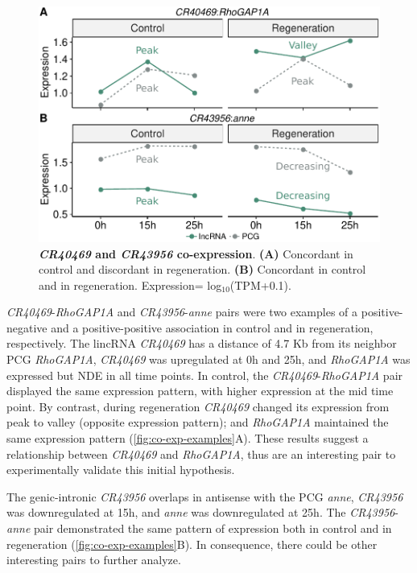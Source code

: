 \begin{figure}[ht!]
  \centering
  \includegraphics[scale=0.6]{plots/results/dme/co.expression.examples.pdf}
  \caption[\textit{CR40469} and \textit{CR43956} co-expression]{\textbf{\textit{CR40469} and \textit{CR43956} co-expression}. \textbf{(A)} Concordant in control and discordant in regeneration. \textbf{(B)} Concordant in control and in regeneration. Expression= log$_{10}$(TPM+0.1).}
  \label{fig:co-exp-examples}
\end{figure}

\textit{CR40469}-\textit{RhoGAP1A} and \textit{CR43956}-\textit{anne} pairs were two examples of a positive-negative and a positive-positive association in control and in regeneration, respectively. The lincRNA \textit{CR40469} has a distance of 4.7 Kb from its neighbor PCG \textit{RhoGAP1A}, \textit{CR40469} was upregulated at 0h and 25h, and \textit{RhoGAP1A} was expressed but NDE in all time points. In control, the  \textit{CR40469}-\textit{RhoGAP1A} pair displayed the same expression pattern, with higher expression at the mid time point. By contrast, during regeneration \textit{CR40469} changed its expression from peak to valley (opposite expression pattern); and \textit{RhoGAP1A} maintained the same expression pattern (\autoref{fig:co-exp-examples}A). These results suggest a relationship between \textit{CR40469} and \textit{RhoGAP1A}, thus are an interesting pair to experimentally validate this initial hypothesis. 

The genic-intronic \textit{CR43956} overlaps in antisense with the PCG \textit{anne}, \textit{CR43956} was downregulated at 15h, and \textit{anne} was downregulated at 25h. The \textit{CR43956}-\textit{anne} pair demonstrated the same pattern of expression both in control and in regeneration (\autoref{fig:co-exp-examples}B). In consequence, there could be other interesting pairs to further analyze. 



